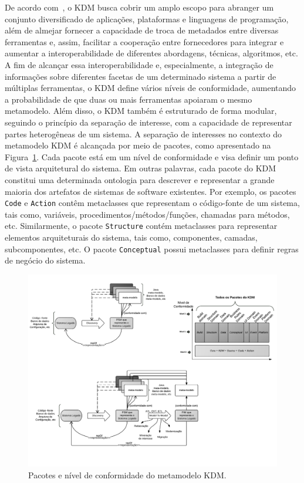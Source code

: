 De acordo com~, o KDM busca cobrir um amplo escopo para abranger um conjunto diversificado de aplicações, plataformas e linguagens de programação, além de almejar fornecer a capacidade de troca de metadados entre diversas ferramentas e, assim, facilitar a cooperação entre fornecedores para integrar e aumentar a interoperabilidade de diferentes abordagens, técnicas, algoritmos, etc. A fim de alcançar essa interoperabilidade e, especialmente, a integração de informações sobre diferentes facetas de um determinado sistema a partir de múltiplas ferramentas, o KDM define vários níveis de conformidade, aumentando a probabilidade de que duas ou mais ferramentas apoiaram o mesmo metamodelo. Além disso, o KDM também é estruturado de forma modular, seguindo o princípio da separação de interesse, com a capacidade de representar partes heterogêneas de um sistema. A separação de interesses no contexto do metamodelo KDM é alcançada por meio de pacotes, como apresentado na Figura~\ref{kdm:domain}. Cada pacote está em um nível de conformidade e visa definir um ponto de vista arquitetural do sistema. Em outras palavras, cada pacote do KDM constitui uma determinada ontologia para descrever e representar a grande maioria dos artefatos de sistemas de software existentes. Por exemplo, os pacotes \texttt{Code} e \texttt{Action} contêm metaclasses que representam o código-fonte de um sistema, tais como, variáveis, procedimentos/métodos/funções, chamadas para métodos, etc. Similarmente, o pacote \texttt{Structure} contém metaclasses para representar elementos arquiteturais do sistema, tais como, componentes, camadas, subcomponentes, etc. O pacote \texttt{Conceptual} possui  metaclasses para definir regras de negócio do sistema.


\begin{figure}[htb]
 \caption{Pacotes e nível de conformidade do metamodelo KDM.}
 \label{kdm:domain}
 \centering
 \includegraphics[scale=1]{images/kdmLevels_pacotes.pdf}
\end{figure}

